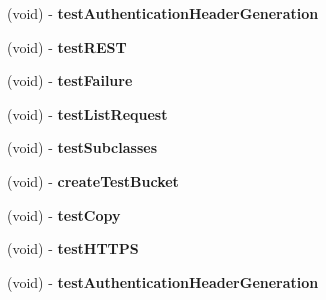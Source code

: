 \begin{DoxyCompactItemize}
\item 
\hypertarget{interface_a_s_i_s3_request_tests_a60bdada8e76611d7d565dff4b2cfd8a9}{
(void) -\/ {\bfseries test\-Authentication\-Header\-Generation}}
\label{interface_a_s_i_s3_request_tests_a60bdada8e76611d7d565dff4b2cfd8a9}

\item 
\hypertarget{interface_a_s_i_s3_request_tests_a8ca48a7b94614a7026f7b7862b722f89}{
(void) -\/ {\bfseries test\-R\-E\-S\-T}}
\label{interface_a_s_i_s3_request_tests_a8ca48a7b94614a7026f7b7862b722f89}

\item 
\hypertarget{interface_a_s_i_s3_request_tests_a91778029a97f36e77dad559977cdb550}{
(void) -\/ {\bfseries test\-Failure}}
\label{interface_a_s_i_s3_request_tests_a91778029a97f36e77dad559977cdb550}

\item 
\hypertarget{interface_a_s_i_s3_request_tests_adf56486c5a0e74cfdf0711c5fa016fb9}{
(void) -\/ {\bfseries test\-List\-Request}}
\label{interface_a_s_i_s3_request_tests_adf56486c5a0e74cfdf0711c5fa016fb9}

\item 
\hypertarget{interface_a_s_i_s3_request_tests_a7d8d7e21e0b483ca67889868688adb7d}{
(void) -\/ {\bfseries test\-Subclasses}}
\label{interface_a_s_i_s3_request_tests_a7d8d7e21e0b483ca67889868688adb7d}

\item 
\hypertarget{interface_a_s_i_s3_request_tests_a8cc7c1272f528811ee7d8f5e07fb1133}{
(void) -\/ {\bfseries create\-Test\-Bucket}}
\label{interface_a_s_i_s3_request_tests_a8cc7c1272f528811ee7d8f5e07fb1133}

\item 
\hypertarget{interface_a_s_i_s3_request_tests_a47ba82f8750aba0ef3928d442442e5c8}{
(void) -\/ {\bfseries test\-Copy}}
\label{interface_a_s_i_s3_request_tests_a47ba82f8750aba0ef3928d442442e5c8}

\item 
\hypertarget{interface_a_s_i_s3_request_tests_ab3c1fecc3be8fa9465a8e7a20de1f49e}{
(void) -\/ {\bfseries test\-H\-T\-T\-P\-S}}
\label{interface_a_s_i_s3_request_tests_ab3c1fecc3be8fa9465a8e7a20de1f49e}

\item 
\hypertarget{interface_a_s_i_s3_request_tests_a60bdada8e76611d7d565dff4b2cfd8a9}{
(void) -\/ {\bfseries test\-Authentication\-Header\-Generation}}
\label{interface_a_s_i_s3_request_tests_a60bdada8e76611d7d565dff4b2cfd8a9}


\end{DoxyCompactItemize}
